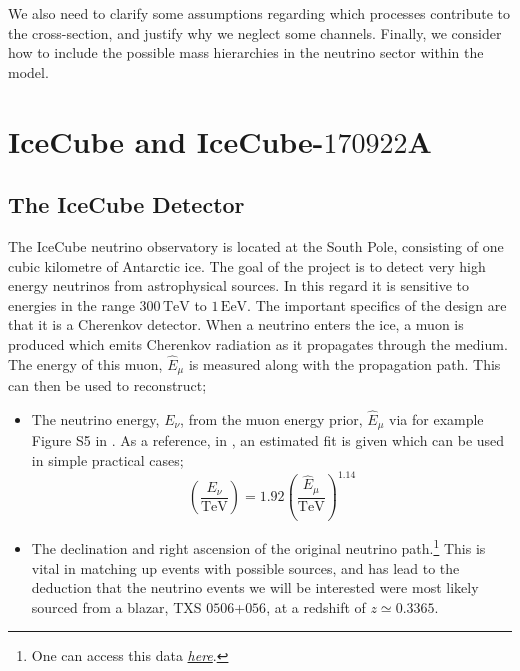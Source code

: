 \documentclass[10pt]{article}
\begin{document}
We also need to clarify some assumptions regarding which processes contribute to the cross-section, and justify why we neglect some channels. Finally, we consider how to include the possible mass hierarchies in the neutrino sector within the model.
\section{IceCube and IceCube-$170922$A}
\subsection{The IceCube Detector}
The IceCube neutrino observatory \cite{IceCube} is located at the South Pole, consisting of one cubic kilometre of Antarctic ice. The goal of the project is to detect very high energy neutrinos from astrophysical sources. In this regard it is sensitive to energies in the range $300\,\text{TeV}$ to $1\,\text{EeV}$. The important specifics of the design are that it is a Cherenkov detector. When a neutrino enters the ice, a muon is produced which emits Cherenkov radiation as it propagates through the medium. The energy of this muon, $\hat{E}_\mu$ is measured along with the propagation path. This can then be used to reconstruct;
\begin{itemize}
  \item The neutrino energy, $E_\nu$, from the muon energy prior, $\hat{E}_\mu$ via for example Figure S5 in \cite{IceCube2018}. As a reference, in \cite{Kelly}, an estimated fit is given which can be used in simple practical cases;
  \begin{equation}
    \left(\frac{E_\nu}{\textrm{TeV}}\right) = 1.92\left(\frac{\hat{E}_\mu}{\textrm{TeV}}\right)^{1.14}
  \end{equation}
  \item The declination and right ascension of the original neutrino path.\footnote{One can access this data \href{https://icecube.wisc.edu/science/data/access}{\textit{here}}.} This is vital in matching up events with possible sources, and has lead to the deduction that the neutrino events we will be interested were most likely sourced from a blazar, TXS $0506$+$056$, at a redshift of $z \simeq 0.3365$.
\end{itemize}
\end{document}
